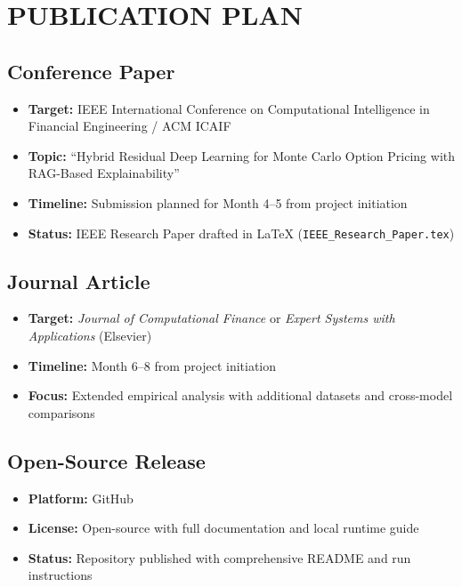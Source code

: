\documentclass[12pt,a4paper]{report}
\begin{document}

\chapter{PUBLICATION PLAN}

\section{Conference Paper}

\begin{itemize}
    \item \textbf{Target:} IEEE International Conference on Computational Intelligence in Financial Engineering / ACM ICAIF
    \item \textbf{Topic:} ``Hybrid Residual Deep Learning for Monte Carlo Option Pricing with RAG-Based Explainability''
    \item \textbf{Timeline:} Submission planned for Month 4--5 from project initiation
    \item \textbf{Status:} IEEE Research Paper drafted in LaTeX (\texttt{IEEE\_Research\_Paper.tex})
\end{itemize}

\section{Journal Article}

\begin{itemize}
    \item \textbf{Target:} \textit{Journal of Computational Finance} or \textit{Expert Systems with Applications} (Elsevier)
    \item \textbf{Timeline:} Month 6--8 from project initiation
    \item \textbf{Focus:} Extended empirical analysis with additional datasets and cross-model comparisons
\end{itemize}

\section{Open-Source Release}

\begin{itemize}
    \item \textbf{Platform:} GitHub
    \item \textbf{License:} Open-source with full documentation and local runtime guide
    \item \textbf{Status:} Repository published with comprehensive README and run instructions
\end{itemize}
\end{document}
